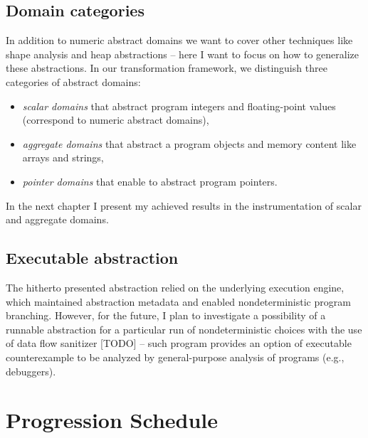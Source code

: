 
\subsection{ Domain categories }

In addition to numeric abstract domains we want to cover other techniques like
shape analysis and heap abstractions -- here I want to focus on how to
generalize these abstractions. In our transformation framework, we distinguish
three categories of abstract domains:

\begin{itemize}
    \item \emph{scalar domains} that abstract program integers and floating-point values (correspond to numeric abstract domains),
    \item \emph{aggregate domains} that abstract a program objects and memory content like arrays and strings,

    \item \emph{pointer domains} that enable to abstract program pointers.
\end{itemize}

In the next chapter I present my achieved results in the instrumentation of scalar and aggregate domains.



\subsection{ Executable abstraction }

The hitherto presented abstraction relied on the underlying execution engine,
which maintained abstraction metadata and enabled nondeterministic program
branching. However, for the future, I plan to investigate a possibility of a
runnable abstraction for a particular run of nondeterministic choices with the
use of data flow sanitizer [TODO] -- such program provides an option of
executable counterexample to be analyzed by general-purpose analysis of \llvm
programs (e.g., debuggers).



\section{Progression Schedule}








